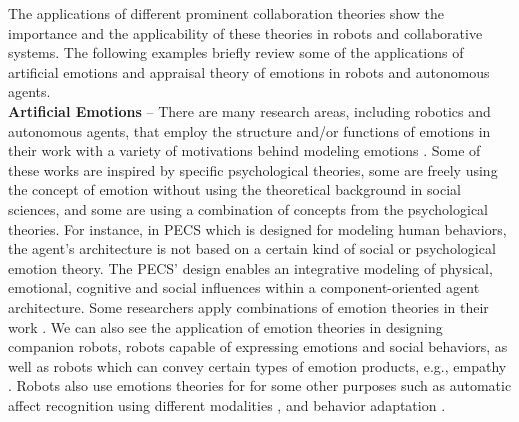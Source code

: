 The applications of different prominent collaboration theories show the
importance and the applicability of these theories in robots and collaborative
systems. The following examples briefly review some of the applications of
artificial emotions and appraisal theory of emotions in robots and autonomous
agents.\\

\textbf{Artificial Emotions} -- There are many research areas, including
robotics and autonomous agents, that employ the structure and/or functions of
emotions in their work with a variety of motivations behind modeling emotions
\cite{wehrle:motivations-modeling-emotion}. Some of these works are inspired by
specific psychological theories, some are freely using the concept of emotion
without using the theoretical background in social sciences, and some are using
a combination of concepts from the psychological theories. For instance, in PECS
\cite{urban:pecs} which is designed for modeling human behaviors, the agent's
architecture is not based on a certain kind of social or psychological emotion
theory. The PECS' design enables an integrative modeling of physical, emotional,
cognitive and social influences within a component-oriented agent architecture.
Some researchers apply combinations of emotion theories in their work
\cite{kiryazov:modeling-appraisal-pad}. We can also see the application of
emotion theories in designing companion robots, robots capable of expressing
emotions and social behaviors, as well as robots which can convey certain types
of emotion products, e.g., empathy \cite{breazeal:expressive-behavior}
\cite{paiva:emotion-modeling} \cite{shayganfar:methodology}. Robots also use
emotions theories for for some other purposes such as automatic affect
recognition using different modalities \cite{zeng:affect-recognition}, and
behavior adaptation \cite{liu:affect-robot-behavior}.\\

